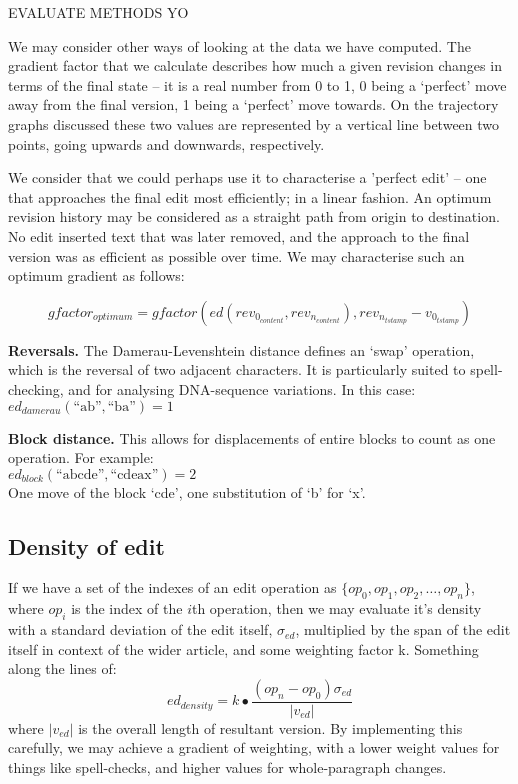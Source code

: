 EVALUATE METHODS YO \label{split-distance-eval}

We may consider other ways of looking at the data we have
computed. The gradient factor that we calculate describes how much a
given revision changes in terms of the final state -- it is a real
number from 0 to 1, 0 being a `perfect' move away from the final
version, 1 being a `perfect' move towards. On the trajectory graphs
discussed these two values are represented by a vertical line between
two points, going upwards and downwards, respectively. 

We consider that we could perhaps use it to characterise a 'perfect
edit' -- one that approaches the final edit most efficiently; in a
linear fashion. An optimum revision history may be considered as a
straight path from origin to destination. No edit inserted text that
was later removed, and the approach to the final version was as
efficient as possible over time. We may characterise such an optimum
gradient as follows:


\[
  gfactor_{optimum} = gfactor(ed(rev_{0_{content}},
  rev_{n_{content}}), rev_{n_{tstamp}} - v_{0_{tstamp}})
\]


\textbf{Reversals.} The Damerau-Levenshtein distance defines an `swap'
operation, which is the reversal of two adjacent characters. It is
particularly suited to spell-checking, and for analysing DNA-sequence
variations. In this case:\\ $ed_{damerau}(\text{``ab''},\text{``ba''})
= 1$

\textbf{Block distance.} This allows for displacements of entire
blocks to count as one operation. For
example:\\ $ed_{block}(\text{``abcde''},\text{``cdeax''})= 2$ \\ One
move of the block `cde', one substitution of `b' for
`x'.\cite{Tichy1984}

\subsection*{Density of edit}

If we have a set of the indexes of an edit operation as
$\{op_0,op_1,op_2,\dots, op_n\}$, where $op_i$ is the index of the
$i$th operation, then we may evaluate it's density with a standard
deviation of the edit itself, $\sigma_{ed}$, multiplied by the span of
the edit itself in context of the wider article, and some weighting
factor k. Something along the lines of:
$$ed_{density} = k\bullet\frac{(op_n - op_0)\sigma_{ed}}{|v_{ed}|}$$
where $|v_{ed}|$ is the overall length of resultant version. By
implementing this carefully, we may achieve a gradient of weighting,
with a lower weight values for things like spell-checks, and higher
values for whole-paragraph changes.

